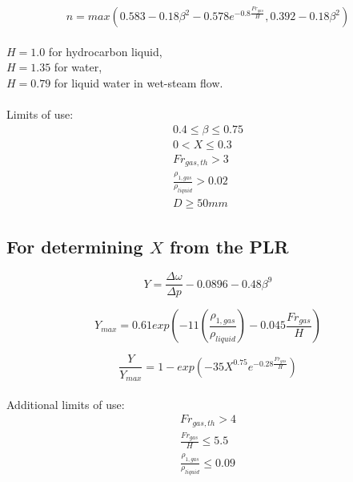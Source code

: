 \documentclass[journal]{IEEEtran}
\begin{document}
\begin{equation}
    n = max \left( 0.583 - 0.18 \beta^{2} - 0.578 e^{-0.8 \frac{Fr_{gas}}{H}}, 0.392 - 0.18 \beta^{2} \right)
\end{equation}
\\
$H = 1.0$ for hydrocarbon liquid,\\
$H = 1.35$ for water,\\
$H = 0.79$ for liquid water in wet-steam flow.
\\
\\
Limits of use: \\
\begin{equation*}
\begin{aligned}
    0.4 \leq \beta \leq 0.75 \\
    0 < X \leq 0.3 \\
    Fr_{gas,th} > 3 \\
    \frac{\rho_{1,gas}}{\rho_{liquid}} > 0.02 \\
    D \geq 50 mm
\end{aligned}
\end{equation*}



\subsection{For determining $X$ from the \acrshort{PLR}}

\begin{equation}
\label{eq:11583_Y}
    Y = \frac{\Delta \omega}{\Delta p} - 0.0896 -0.48 \beta^{9}
\end{equation}

\begin{equation}
\label{eq:11583_Ymax}
    Y_{max} = 0.61 exp \left( -11 \left( \frac{\rho_{1,gas}}{\rho_{liquid}} \right) - 0.045 \frac{Fr_{gas}}{H} \right)
\end{equation}

\begin{equation}
\label{eq:11583_Y/Ymax}
    \frac{Y}{Y_{max}} = 1 - exp \left(-35 X^{0.75} e^{-0.28 \frac{Fr_{gas}}{H}} \right)
\end{equation}
\\
Additional limits of use: \\
\begin{equation*}
\begin{aligned}
    Fr_{gas,th} > 4 \\
    \frac{Fr_{gas}}{H} \leq 5.5 \\
    \frac{\rho_{1,gas}}{\rho_{liquid}} \leq 0.09
\end{aligned}
\end{equation*}
\end{document}
